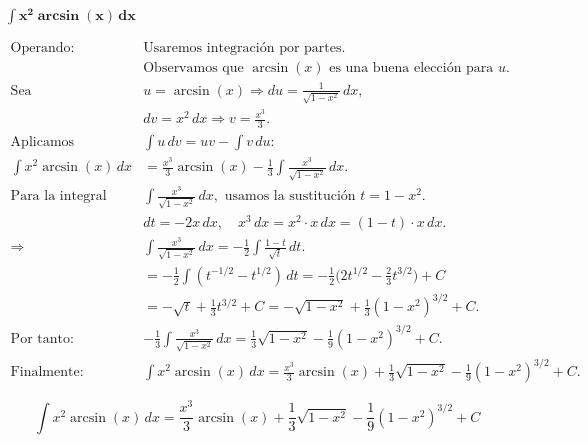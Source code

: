 $\displaystyle \mathbf{\int x^{2} \arcsin(x)\,dx}$

\nopagebreak
$$
\begin{aligned}
\text{Operando: } & \text{Usaremos integración por partes.} \\[4pt]
& \text{Observamos que } \arcsin(x) \text{ es una buena elección para } u. \\[6pt]
\text{Sea } &u = \arcsin(x) \Rightarrow du = \frac{1}{\sqrt{1-x^{2}}}\,dx, \\[6pt]
&dv = x^{2}\,dx \Rightarrow v = \frac{x^{3}}{3}. \\[6pt]
\text{Aplicamos } &\int u\,dv = uv - \int v\,du: \\[6pt]
\int x^{2}\arcsin(x)\,dx
&= \frac{x^{3}}{3}\arcsin(x)
- \frac{1}{3}\int \frac{x^{3}}{\sqrt{1-x^{2}}}\,dx. \\[6pt]
\text{Para la integral } &
\int \frac{x^{3}}{\sqrt{1-x^{2}}}\,dx, \text{ usamos la sustitución } t = 1-x^{2}. \\[4pt]
&dt = -2x\,dx, \quad x^{3}\,dx = x^{2}\cdot x\,dx = (1-t)\cdot x\,dx. \\[6pt]
\Rightarrow &
\int \frac{x^{3}}{\sqrt{1-x^{2}}}\,dx
= -\tfrac{1}{2}\int \frac{1-t}{\sqrt{t}}\,dt. \\[6pt]
&= -\tfrac{1}{2}\int (t^{-1/2} - t^{1/2})\,dt
= -\tfrac{1}{2}\Big( 2t^{1/2} - \tfrac{2}{3}t^{3/2} \Big) + C \\[6pt]
&= -\sqrt{t} + \tfrac{1}{3}t^{3/2} + C
= -\sqrt{1-x^{2}} + \tfrac{1}{3}(1-x^{2})^{3/2} + C. \\[6pt]
\text{Por tanto: } &
-\tfrac{1}{3}\int \frac{x^{3}}{\sqrt{1-x^{2}}}\,dx
= \tfrac{1}{3}\sqrt{1-x^{2}} - \tfrac{1}{9}(1-x^{2})^{3/2} + C. \\[6pt]
\text{Finalmente: } &
\int x^{2}\arcsin(x)\,dx
= \frac{x^{3}}{3}\arcsin(x)
+ \frac{1}{3}\sqrt{1-x^{2}}
- \frac{1}{9}(1-x^{2})^{3/2} + C.
\end{aligned}
$$

$$
\boxed{\displaystyle 
\int x^{2}\arcsin(x)\,dx
= \frac{x^{3}}{3}\arcsin(x)
+ \frac{1}{3}\sqrt{1-x^{2}}
- \frac{1}{9}(1-x^{2})^{3/2} + C}
$$
